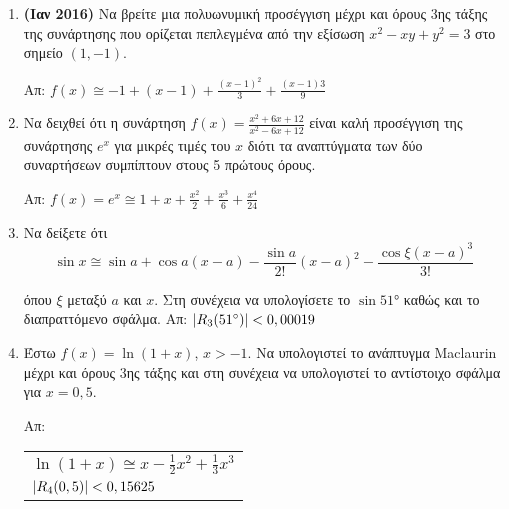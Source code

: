 \begin{enumerate}
	\item{\bfseries (Ιαν 2016)} Να βρείτε μια πολυωνυμική προσέγγιση μέχρι και όρους 3ης τάξης της
		συνάρτησης που ορίζεται πεπλεγμένα από την εξίσωση $ x^{2} - xy + y^{2}
		= 3$ στο σημείο $ (1,-1) $.

		\hfill Απ: $f(x) \cong -1 + (x-1) + \frac{(x-1)^{2}}{3} +
		\frac{(x-1){3}}{9}$

	\item Να δειχθεί ότι η συνάρτηση $ f(x) = \frac{x^{2} + 6x + 12}{x^{2} - 6x
		+ 12} $ είναι καλή προσέγγιση της συνάρτησης $ e^{x} $ για μικρές τιμές
		του $x$ διότι τα αναπτύγματα των δύο συναρτήσεων συμπίπτουν στους 5
		πρώτους όρους. 

		\hfill Απ: $ f(x) = e^{x} \cong 1 + x + \frac{x^{2}}{2} +
		\frac{x^{3}}{6} + \frac{x^{4}}{24} $

	\item Να δείξετε ότι 
		\[
			\sin{x} \cong \sin{a} + \cos{a} (x-a) - \frac{\sin{a}}{2!} (x-a)^{2} -
			\frac{\cos{\xi} (x-a)^{3}}{3!}
		\]

		όπου $\xi$ μεταξύ $a$ και $x$. Στη συνέχεια να υπολογίσετε το $
		\sin{\ang{51}}$ καθώς και το διαπραττόμενο σφάλμα.
		\hfill Απ: $ \abs{R_{3}(\ang{51})} < 0,00019 $

	\item Έστω $ f(x) = \ln{(1+x)} $, $ x>-1 $. Να υπολογιστεί το ανάπτυγμα
		\textlatin{Maclaurin} μέχρι και όρους 3ης τάξης και στη συνέχεια να
		υπολογιστεί το αντίστοιχο σφάλμα για $ x = 0,5 $.

		\hfill Απ: \begin{tabular}{l}
			$ \ln(1+x) \cong x - \frac{1}{2} x^{2} + \frac{1}{3}x^{3} $ \\
			$ \abs{R_{4}(0,5)} < 0,15625 $	
		\end{tabular}


\end{enumerate}



